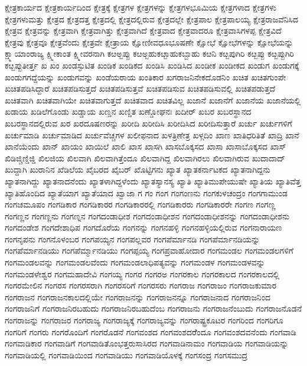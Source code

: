{ಕ್ಷೇತ್ರಕಾರ್ಯದ
ಕ್ಷೇತ್ರಕಾರ್ಯದಿಂದ
ಕ್ಷೇತ್ರಕ್ಕೆ
ಕ್ಷೇತ್ರಗಳ
ಕ್ಷೇತ್ರಗಳನ್ನು
ಕ್ಷೇತ್ರಗಳಭೂಮಿಯ
ಕ್ಷೇತ್ರಗಳಾದ
ಕ್ಷೇತ್ರಗಳು
ಕ್ಷೇತ್ರಗಳುಮತ್ತು
ಕ್ಷೇತ್ರದ
ಕ್ಷೇತ್ರದತ್ತ
ಕ್ಷೇತ್ರದಲ್ಲಿ
ಕ್ಷೇತ್ರದಲ್ಲಿರುವ
ಕ್ಷೇತ್ರದಲ್ಲೇ
ಕ್ಷೇತ್ರಪಾಲ
ಕ್ಷೇತ್ರಪಾಲಯ್ಯ
ಕ್ಷೇತ್ರರಾಜವೆನಿಸಿದ
ಕ್ಷೇತ್ರವ
ಕ್ಷೇತ್ರವನ್ನು
ಕ್ಷೇತ್ರವಾಗಿ
ಕ್ಷೇತ್ರವಾಗಿತ್ತು
ಕ್ಷೇತ್ರವಾಗಿದೆ
ಕ್ಷೇತ್ರವಾದ
ಕ್ಷೇತ್ರವಾದರೂ
ಕ್ಷೇತ್ರವಾಸಿಗಳಪ್ಪ
ಕ್ಷೇತ್ರವಿದೆ
ಕ್ಷೇತ್ರವು
ಕ್ಷೇತ್ರವೂ
ಕ್ಷೇತ್ರವೆಂದು
ಕ್ಷೇತ್ರವೇ
ಕ್ಷೇತ್ರಾಯ
ಕ್ಷೋಣೀವಧೂಭೂಷಣೇ
ಕ್ಷೋಭೆ
ಕ್ಷೋಭೆಗಳನ್ನು
ಕ್ಷೋಭೆಯನ್ನು
ಕ್ಷ್ಮಾಯಾಂರಾಜ್ಯ
ಕ್ಷ್ಮೀಕಾಂತ
ಕ್ಷ್ಮೀವರನಾಗಿ
ಕೞಅ್ಬಪ್ಪು
ಕೞಅ್ಬಹುಕೞ್ಬಾಹುಕಬ್ಬಾಹು
ಕೞನಿ
ಕೞ್ಬಪುಗಿರಿ
ಕೞ್ಬಪ್ಪು
ಕೞ್ಬಪ್ಪುಗಿರಿ
ಕೞ್ಬಪ್ಪುತೀರ್ತ್ತ
ಖ
ಖಂ
ಖಂಡಸ್ಫುಟಿತ
ಖಂಡಿಕ
ಖಂಡಿಕದ
ಖಂಡಿಸಿ
ಖಂಡಿಸಿದ
ಖಂಡೀಕ
ಖಂಡೀಕದ
ಖಂಡುಗ
ಖಂಡುಗಕ್ಕೆ
ಖಂಡುಗಗದ್ದೆಯನ್ನು
ಖಂಡುಗವನ್ನು
ಖಂಡೆಯರಾಯ
ಖಂತಿಕಾರ
ಖಗರಾಜನಿನೇಕದೊಡನಿಂ
ಖಚಿತ
ಖಚಿತಗುಂಪೇ
ಖಚಿತಪಡಿಸಿದ್ದಾರೆ
ಖಚಿತಪಡಿಸುತ್ತದೆ
ಖಚಿತಪಡಿಸುತ್ತವೆ
ಖಚಿತಪಡಿಸುವ
ಖಚಿತಪಡಿಸುವಲ್ಲಿ
ಖಚಿತಪಡುತ್ತದೆ
ಖಚಿತವಾಗಿ
ಖಚಿತವಾಗಿಯೇ
ಖಚಿತವಾಗುತ್ತದೆ
ಖಚಿತವಾದ
ಖಚಿತವಿಲ್ಲ
ಖಜಾನೆ
ಖಜಾನೆಗೆ
ಖಜಾನೆಯ
ಖಜಾನೆಯಲ್ಲಿ
ಖಡಾಯ
ಖಡಿಲೆಗೊಂಡು
ಖಡ್ಡಾಯ
ಖಣ್ಡನ
ಖಣ್ಡಿತ
ಖಣ್ಡೋಘನಃ
ಖದೀರ್
ಖಬರ
ಖಬರಸ್ಥಾನದ
ಖಬರಸ್ಥಾನದಲ್ಲಿರುವ
ಖರ
ಖರದೂಷಣರನ್ನು
ಖರೀದಿ
ಖರೀದಿಸಿ
ಖರೀದಿಸಿದ
ಖರೀದಿಸುತ್ತಾರೆ
ಖರ್ಚು
ಖರ್ಚುಗಳಿಗೆ
ಖರ್ಚುಮಾಡಿ
ಖರ್ಚುಮಾಡಿದ
ಖರ್ಚುವೆಚ್ಚಗಳ
ಖಲೀಫನಾದ
ಖಳತ್ರಿಣೇತ್ರ
ಖಳ್ಗದಿಂ
ಖಾಣ
ಖಾತಿಧರಿತಿತೆ
ಖಾದ್ರಿ
ಖಾನೆ
ಖಾನೆಯೆಂದು
ಖಾನ್
ಖಾಯಂ
ಖಾಯಿಲೆ
ಖಾಲಿ
ಖಾಸ
ಖಾಸಗಿ
ಖಾಸಬೊಕ್ಕಸದ
ಖಾಸಾ
ಖಾಸಾಬೊಕ್ಕಸದ
ಖಾಸ್
ಖಿಡಿಜ್ಚಿಣ್ಡಿಜ್ಡಿ
ಖಿಲಜಿಯ
ಖಿಲವಾಗಿ
ಖಿಲವಾಗಿತ್ತೆಂದೂ
ಖಿಲವಾಗಿದ್ದ
ಖಿಲವಾಗಿರಲು
ಖಿಲವಾಗಿರುವ
ಖುದಾದಾದ್
ಖುದ್ದಾಗಿ
ಖುರಾನಿನ
ಖೆಡಿಲೆಯ
ಖೈಬರದ
ಖೈಬರ್
ಖೊಟ್ಟಿಗನು
ಖ್ಯಾತ
ಖ್ಯಾತಕರ್ನಾಟಕದ
ಖ್ಯಾತನಾಗಿದ್ದನು
ಖ್ಯಾತನಾಗಿದ್ದು
ಖ್ಯಾತನಾದನೆಂದು
ಖ್ಯಾತಳಾಗಿದ್ದಳೆಂದು
ಖ್ಯಾತಸ್ಯಾನಸ್ಯ
ಖ್ಯಾತಿ
ಖ್ಯಾತಿಮುಪೇಯುಷೇ
ಖ್ಯಾತಿಯ
ಖ್ಯಾತಿವೆತ್ತ
ಖ್ಯಾತಿಹೊಂದಿದ
ಖ್ಯಾತೆಯಾಗ
ಖ್ಯಾತೆಯಾದ
ಖ್ವಾಜಾ
ಗ
ಗಂ
ಗಂಗ
ಗಂಗಂಣನು
ಗಂಗಕುಳಚಂದ್ರಂ
ಗಂಗಗಾಮುಂಡ
ಗಂಗಚಮೂಪಂ
ಗಂಗಡಿಕಾರ
ಗಂಗಡಿಕಾರರ
ಗಂಗಡಿಕಾರರಲ್ಲಿ
ಗಂಗಡಿಕಾರರು
ಗಂಗಡಿಕಾರರೇ
ಗಂಗಣ
ಗಂಗಣ್ಣ
ಗಂಗಣ್ಣನ
ಗಂಗಣ್ಣನು
ಗಂಗಣ್ನನ
ಗಂಗದಂಡಾಧೀಶ
ಗಂಗದಂಡಾಧೀಶನ
ಗಂಗದಂಡಾಧೀಶನನ್ನು
ಗಂಗದಂಡಾಧೀಶನು
ಗಂಗದಂಡೇಶ
ಗಂಗದೇಶಾಧಿಪ
ಗಂಗದೊರೆಯ
ಗಂಗನನ್ನು
ಗಂಗನಹಳ್ಳಿ
ಗಂಗನಹಳ್ಳಿಯಲ್ಲಿರುವ
ಗಂಗನಾರಾಯಣ
ಗಂಗನೃಪನು
ಗಂಗನೊಳಂಬರ
ಗಂಗಪಯ್ಯನ
ಗಂಗಪಲ್ಲವರ
ಗಂಗಪೆರ್ಮಾನಡಿ
ಗಂಗಪೆರ್ಮಾನಡಿಯನ್ನು
ಗಂಗಪೆರ್ಮಾನಡಿಯು
ಗಂಗಪೆರ್ಮ್ಮಾನಡಿಯು
ಗಂಗಪ್ಪಯ್ಯ
ಗಂಗಪ್ರವಾಹೋದಾರ
ಗಂಗಮಂಡಲ
ಗಂಗಮಂಡಲಗಳಿಗೆ
ಗಂಗಮಂಡಲವನ್ನು
ಗಂಗಮಂಡಲವೆಂದು
ಗಂಗಮಂಡಲಾಧಿಪತ್ಯವನ್ನು
ಗಂಗಮಂಡಳ
ಗಂಗಮಂಡಳವನ್ನು
ಗಂಗಮಂಡಳೇಶ್ವರ
ಗಂಗಮಹಾದೇವಿ
ಗಂಗಯ್ಯ
ಗಂಗರ
ಗಂಗರಅ
ಗಂಗರಕಾಲ
ಗಂಗರಕಾಲದ
ಗಂಗರಕಾಲದಲ್ಲಿ
ಗಂಗರಮೇಲಿನ
ಗಂಗರಸ
ಗಂಗರಸರಾಗಿ
ಗಂಗರಸರಿಗೆ
ಗಂಗರಸರು
ಗಂಗರಾಜ
ಗಂಗರಾಜಂ
ಗಂಗರಾಜಕುಮಾರ
ಗಂಗರಾಜನ
ಗಂಗರಾಜನಕಾಲದಲ್ಲಿಯೇ
ಗಂಗರಾಜನನ್ನು
ಗಂಗರಾಜನನ್ನೂ
ಗಂಗರಾಜನಾದ
ಗಂಗರಾಜನಿಂದ
ಗಂಗರಾಜನಿಗೆ
ಗಂಗರಾಜನಿರಬಹುದು
ಗಂಗರಾಜನಿರಬಹುದೆಂಬ
ಗಂಗರಾಜನು
ಗಂಗರಾಜನೆಂಬುದು
ಗಂಗರಾಜನೊಡನೆ
ಗಂಗರಾಜನ್ನು
ಗಂಗರಾಜರ
ಗಂಗರಾಜ್ಯ
ಗಂಗರಾಜ್ಯಕ್ಕೆ
ಗಂಗರಾಜ್ಯವನ್ನು
ಗಂಗರಾಷ್ಟ್ರಕೂಟರ
ಗಂಗರಿಂದ
ಗಂಗರಿಗೂ
ಗಂಗರಿಗೆ
ಗಂಗರು
ಗಂಗರೊಂದಿಗೆ
ಗಂಗರೊಡನೆ
ಗಂಗವಂಶದ
ಗಂಗವಂಶದರೆೆಂದೂ
ಗಂಗವಂಶದವನೆಂದು
ಗಂಗವಾಡಿ
ಗಂಗವಾಡಿಕಾರ
ಗಂಗವಾಡಿಗೆ
ಗಂಗವಾಡಿತೊಂಭತ್ತರುಸಾಸಿರದ
ಗಂಗವಾಡಿನಾಮಂ
ಗಂಗವಾಡಿಯ
ಗಂಗವಾಡಿಯನ್ನು
ಗಂಗವಾಡಿಯಲ್ಲಿ
ಗಂಗವಾಡಿಯಿಂದ
ಗಂಗವಾಡಿಯು
ಗಂಗವಾಡಿಯೊಳಕ್ಕೆ
ಗಂಗಸಂದ್ರ
ಗಂಗಸಮುದ್ರ
}
